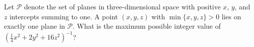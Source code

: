 Let $\mathcal P$ denote the set of planes in three-dimensional space with positive $x$, $y$, and $z$ intercepts summing to one. A point $(x,y,z)$ with $\min \{x,y,z\} > 0$ lies on exactly one plane in $\mathcal P$. What is the maximum possible integer value of $\left(\frac{1}{4} x^2 + 2y^2 + 16z^2\right)^{-1}$?

